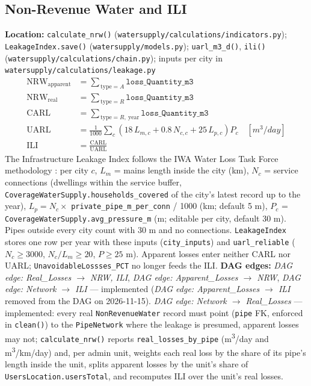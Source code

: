 \documentclass[11pt]{article}
\newcommand{\code}[1]{\texttt{#1}}
\newcommand{\dagedge}[1]{\textit{DAG edge: #1}}
\newcommand{\statusdone}{\textcolor{green!50!black}{implemented}}
\begin{document}
\subsection{Non-Revenue Water and ILI}
\textbf{Location:} \code{calculate\_nrw()} (\code{watersupply/calculations/indicators.py}); \code{LeakageIndex.save()} (\code{watersupply/models.py}); \code{uarl\_m3\_d()}, \code{ili()} (\code{watersupply/calculations/chain.py}); inputs per city in \code{watersupply/calculations/leakage.py}
\begin{align}
  \text{NRW}_{\text{apparent}} &= \sum_{\,\text{type}=A} \texttt{loss\_Quantity\_m3} \\
  \text{NRW}_{\text{real}} &= \sum_{\,\text{type}=R} \texttt{loss\_Quantity\_m3} \\
  \text{CARL} &= \sum_{\,\text{type}=R,\ \text{year}} \texttt{loss\_Quantity\_m3} \\
  \text{UARL} &= \frac{1}{1000} \sum_{c} \left(18\,L_{m,c} + 0.8\,N_{c,c} + 25\,L_{p,c}\right) P_c \quad [\si{m^3/day}] \\
  \text{ILI} &= \frac{\text{CARL}}{\text{UARL}}
\end{align}
The Infrastructure Leakage Index follows the IWA Water Loss Task Force methodology \cite{IWA_WLTF}: per city $c$, $L_m$ = mains length inside the city (km), $N_c$ = service connections (dwellings within the service buffer, \code{CoverageWaterSupply.households\_covered} of the city's latest record up to the year), $L_p = N_c \times$ \code{private\_pipe\_m\_per\_conn} / 1000 (km; default 5 m), $P_c$ = \code{CoverageWaterSupply.avg\_pressure\_m} (m; editable per city, default 30 m). Pipes outside every city count with 30 m and no connections. \code{LeakageIndex} stores one row per year with these inputs (\code{city\_inputs}) and \code{uarl\_reliable} ($N_c \ge 3000$, $N_c/L_m \ge 20$, $P \ge 25$ m). Apparent losses enter neither CARL nor UARL; \code{UnavoidableLossses\_PCT} no longer feeds the ILI. \textbf{DAG edges:} \dagedge{Real\_Losses $\rightarrow$ NRW, ILI}, \dagedge{Apparent\_Losses $\rightarrow$ NRW}, \dagedge{Network $\rightarrow$ ILI} --- \statusdone{} (\dagedge{Apparent\_Losses $\rightarrow$ ILI} removed from the DAG on 2026-11-15). \dagedge{Network $\rightarrow$ Real\_Losses} --- \statusdone{}: every real \code{NonRevenueWater} record must point (\code{pipe} FK, enforced in \code{clean()}) to the \code{PipeNetwork} where the leakage is presumed, apparent losses may not; \code{calculate\_nrw()} reports \code{real\_losses\_by\_pipe} (\si{m^3/day} and \si{m^3/km/day}) and, per admin unit, weights each real loss by the share of its pipe's length inside the unit, splits apparent losses by the unit's share of \code{UsersLocation.usersTotal}, and recomputes ILI over the unit's real losses.
\end{document}
